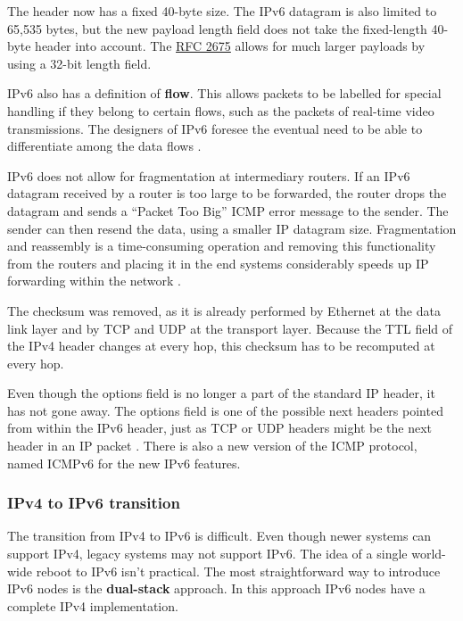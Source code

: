 The header now has a fixed 40-byte size.
The IPv6 datagram is also limited to 65,535 bytes, but the new payload length field does not take the fixed-length 40-byte header into account.
The \href{https://tools.ietf.org/html/rfc2675}{RFC 2675} allows for much larger payloads by using a 32-bit length field.

IPv6 also has a definition of \textbf{flow}. This allows packets to be labelled for special handling if they belong to certain flows, such as the packets of real-time video transmissions.
The designers of IPv6 foresee the eventual need to be able to differentiate among the data flows \cite{computer-networking-kurose-2012}.

IPv6 does not allow for fragmentation at intermediary routers.
If an IPv6 datagram received by a router is too large to be forwarded, the router drops the datagram and sends a ``Packet Too Big'' ICMP error message to the sender.
The sender can then resend the data, using a smaller IP datagram size.
Fragmentation and reassembly is a time-consuming operation and removing this functionality from the routers and placing it in the end systems considerably speeds up IP forwarding within the network \cite[p.~358]{computer-networking-kurose-2012}.

The checksum was removed, as it is already performed by Ethernet at the data link layer and by TCP and UDP at the transport layer.
Because the TTL field of the IPv4 header changes at every hop, this checksum has to be recomputed at every hop.

Even though the options field is no longer a part of the standard IP header, it has not gone away.
The options field is one of the possible next headers pointed from within the IPv6 header, just as TCP or UDP headers might be the next header in an IP packet \cite[p.~359]{computer-networking-kurose-2012}.
There is also a new version of the ICMP protocol, named ICMPv6 for the new IPv6 features.

\subsubsection{IPv4 to IPv6 transition}

The transition from IPv4 to IPv6 is difficult. Even though newer systems can support IPv4, legacy systems may not support IPv6. The idea of a single world-wide reboot to IPv6 isn't practical. The most straightforward way to introduce IPv6 nodes is the \textbf{dual-stack} approach. In this approach IPv6 nodes have a complete IPv4 implementation.


